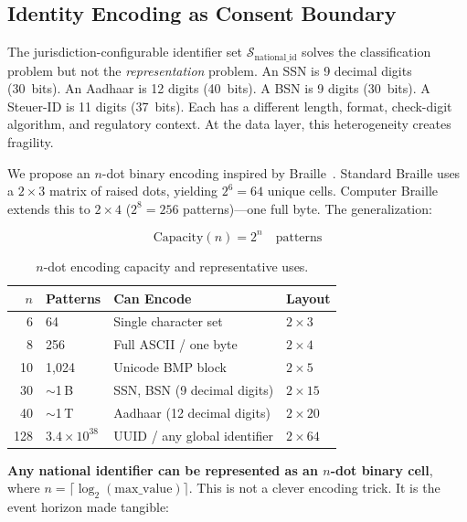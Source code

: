 \documentclass[11pt,twocolumn]{article}
\begin{document}
\subsection{Identity Encoding as Consent Boundary}

The jurisdiction-configurable identifier set $\mathcal{S}_{\text{national\_id}}$ solves the classification problem but not the \emph{representation} problem. An SSN is 9 decimal digits (30~bits). An Aadhaar is 12 digits (40~bits). A BSN is 9 digits (30~bits). A Steuer-ID is 11 digits (37~bits). Each has a different length, format, check-digit algorithm, and regulatory context. At the data layer, this heterogeneity creates fragility.

We propose an $n$-dot binary encoding inspired by Braille~\cite{braille1829}. Standard Braille uses a $2 \times 3$ matrix of raised dots, yielding $2^6 = 64$ unique cells. Computer Braille extends this to $2 \times 4$ ($2^8 = 256$ patterns)---one full byte. The generalization:

\begin{equation}
\text{Capacity}(n) = 2^n \quad \text{patterns}
\end{equation}

\begin{table}[H]
\centering
\small
\begin{tabular}{@{}rlll@{}}
\toprule
\textbf{$n$} & \textbf{Patterns} & \textbf{Can Encode} & \textbf{Layout} \\
\midrule
6  & 64        & Single character set   & $2 \times 3$ \\
8  & 256       & Full ASCII / one byte  & $2 \times 4$ \\
10 & 1{,}024   & Unicode BMP block      & $2 \times 5$ \\
30 & $\sim$1\,B & SSN, BSN (9 decimal digits) & $2 \times 15$ \\
40 & $\sim$1\,T & Aadhaar (12 decimal digits) & $2 \times 20$ \\
128 & $3.4 \times 10^{38}$ & UUID / any global identifier & $2 \times 64$ \\
\bottomrule
\end{tabular}
\caption{$n$-dot encoding capacity and representative uses.}
\label{tab:ndot}
\end{table}

\textbf{Any national identifier can be represented as an $n$-dot binary cell}, where $n = \lceil \log_2(\text{max\_value}) \rceil$. This is not a clever encoding trick. It is the event horizon made tangible:
\end{document}
